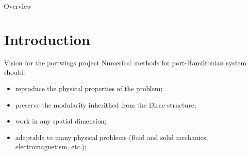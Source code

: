 \documentclass[aspectratio=169]{beamer}
\begin{document}
\begin{frame}[plain]


    
\end{frame}

\begin{frame}{Overview}
	\tableofcontents
\end{frame}

\section{Introduction}

\begin{frame}{Vision for the portwings project}
	Numerical methods for port-Hamiltonian system should:
	\begin{itemize}
		\item reproduce the physical properties of the problem;
		\item preserve the modularity inherithed from the Dirac structure;
		\item work in any spatial dimension;
		\item adaptable to many physical problems (fluid and solid mechanics, electromagnetism, etc.);
	\end{itemize}
\end{frame}
\end{document}
